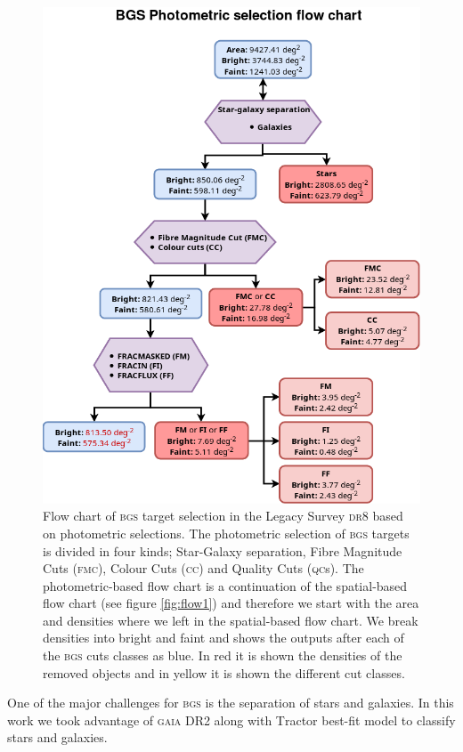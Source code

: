 \documentclass[fleqn,usenatbib]{mnras}
\newcommand{\BGS}{\textsc{bgs}\xspace}
\newcommand{\CC}{\textsc{cc}\xspace}
\newcommand{\DReight}{\textsc{dr8}\xspace}
\newcommand{\FMC}{{\textsc{fmc}}\xspace}
\newcommand{\GAIA}{\textsc{gaia}\xspace}
\newcommand{\QCs}{\textsc{qc}s\xspace}
\newcommand{\TRACTOR}{\textsc{T}ractor\xspace}
\begin{document}
\begin{figure}
	\includegraphics[width=\columnwidth]{images/flow_phot.png}
    \caption{Flow chart of \BGS target selection in the Legacy Survey \DReight based on photometric selections. The photometric selection of \BGS targets is divided in four kinds; Star-Galaxy separation, Fibre Magnitude Cuts (\FMC), Colour Cuts (\CC) and Quality Cuts (\QCs). The photometric-based flow chart is a continuation of the spatial-based flow chart (see figure \ref{fig:flow1}) and therefore we start with the area and densities where we left in the spatial-based flow chart. We break densities into bright and faint and shows the outputs after each of the \BGS cuts classes as blue. In red it is shown the densities of the removed objects and in yellow it is shown the different cut classes.}
    \label{fig:flow2}
\end{figure}

One of the major challenges for \BGS is the separation of stars and galaxies. In this work we took advantage of \GAIA DR2 \citep{2018A&A...616A...1G} along with \TRACTOR best-fit model to classify stars and galaxies. 
\end{document}

